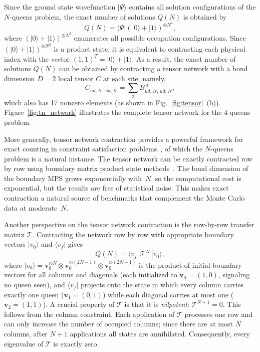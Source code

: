 \documentclass[aps, pre, reprint, amsmath, amssymb, superscriptaddress, floatfix]{revtex4-2}
\begin{document}
Since the ground state wavefunction $|\Psi \rangle$ contains all solution 
configurations of the $N$-queens problem, the exact number of solutions $Q(N)$ 
is obtained by 
\begin{equation}
Q(N) = \langle \Psi | (|0 \rangle +  |1 \rangle)^{\otimes N^2},
\end{equation}
where $(|0 \rangle +  |1 \rangle)^{\otimes N^2}$ enumerates all possible 
occupation configurations. Since $(|0 \rangle +  |1 \rangle)^{\otimes N^2}$ 
is a product state, it is equivalent to contracting each physical index with 
the vector $(1,1)^T = |0\rangle + |1\rangle$. As a result, the exact number
of solutions $Q(N)$ can be obtained by contracting a tensor network with a 
bond dimension $D=2$ local tensor $C$ at each site, namely,
\begin{equation}
  C_{ud,\,lr,\,\bar{u}\bar{d},\,\bar{l}\bar{r}} = \sum_{\alpha} B_{ud,\,lr,\,\bar{u}\bar{d},\,\bar{l}\bar{r}}^{\,\alpha},
   \label{eq:Ctensor}
  \end{equation}
 which also has 17 nonzero elements (as shown in Fig.~\ref{fig:tensor}~(b)).
Figure~\ref{fig:tn_network} illustrates the complete tensor network for 
the 4-queens problem.

More generally, tensor network contraction provides a powerful
framework for exact counting in constraint satisfaction
problems~\cite{Kourtis2019,Vanderstraeten2018,Tanaka2023}, of which the $N$-queens problem is a
natural instance.
The tensor network can be exactly contracted row by row using
boundary matrix product state methods~\cite{Xiang2024}.  The bond
dimension of the boundary MPS grows exponentially with~$N$, so the
computational cost is exponential, but the results are free of
statistical noise.  This makes exact contraction a natural source of
benchmarks that complement the Monte Carlo data at moderate~$N$.

Another perspective on the tensor network contraction is the
row-by-row transfer matrix $\mathcal{T}$.  Contracting the network
row by row with appropriate boundary vectors $|v_0\rangle$ and
$\langle v_f|$ gives
\begin{equation}
  Q(N) = \langle v_f |\,\mathcal{T}^N\,| v_0 \rangle,
\end{equation}
where $|v_0\rangle = \mathbf{v}_0^{\otimes N} \otimes
\mathbf{v}_0^{\otimes (2N-1)} \otimes \mathbf{v}_0^{\otimes (2N-1)}$
is the product of initial boundary vectors for all columns and
diagonals (each initialized to $\mathbf{v}_0 = (1,0)$, signaling no
queen seen), and $\langle v_f|$ projects onto the state in which every
column carries exactly one queen ($\mathbf{v}_1 = (0,1)$) while each
diagonal carries at most one ($\mathbf{v}_2 = (1,1)$).
A crucial property of $\mathcal{T}$ is that it is
\emph{nilpotent}: $\mathcal{T}^{N+1} = 0$.
This follows from the column constraint.  Each application of
$\mathcal{T}$ processes one row and can only increase the number of
occupied columns; since there are at most $N$ columns, after $N+1$
applications all states are annihilated.  Consequently, every
eigenvalue of $\mathcal{T}$ is exactly zero.
\end{document}
